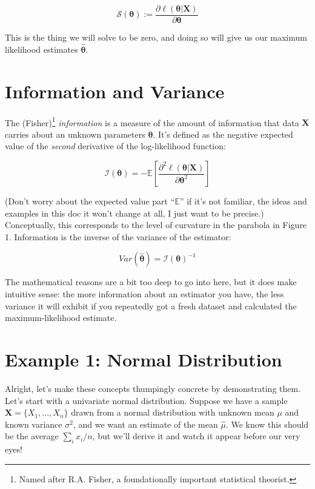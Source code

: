 \documentclass{article}
\begin{document}
\begin{equation}
\mathcal{S}(\boldsymbol{\theta}) := \frac{\partial \ell(\boldsymbol{\theta}|\mathbf{X})}{\partial \mathbf{\theta}}
\end{equation}

This is the thing we will solve to be zero, and doing so will give us our maximum likelihood estimates $\hat{\boldsymbol{\theta}}$.

\section{Information and Variance}

The (Fisher)\footnote{Named after R.A. Fisher, a foundationally important statistical theorist.} \textit{information} is a measure of the amount of information that data $\mathbf{X}$ carries about an unknown parameters
$\boldsymbol{\theta}$. It's defined as the negative expected value of the \textit{second} derivative of the log-likelihood function:

\begin{equation}
\mathcal{I}(\boldsymbol{\theta}) = -\mathbb{E}\left[\frac{\partial^2 \ell(\boldsymbol{\theta}|\mathbf{X})}{\partial \boldsymbol{\theta}^2}\right]
\end{equation}

(Don't worry about the expected value part ``$\mathbb{E}$'' if it's not familiar, the ideas and examples in this doc it won't change at all, I just want to be precise.) Conceptually, this corresponds to the level of curvature in the parabola in Figure 1. Information is the inverse of the variance of the estimator:

\begin{equation}
Var(\hat{\boldsymbol{\theta}}) = \mathcal{I}(\boldsymbol{\theta})^{-1}
\end{equation}

The mathematical reasons are a bit too deep to go into here, but it does make intuitive sense: the more information about an estimator you have, the less variance it will exhibit if you repeatedly got a fresh dataset and calculated the maximum-likelihood estimate.

\section{Example 1: Normal Distribution}

Alright, let's make these concepts thumpingly concrete by demonstrating them. Let's start with a univariate normal distribution. Suppose we have a sample $\mathbf{X}=\{X_1, ..., X_n\}$ drawn from a normal distribution with unknown mean $\mu$ and known variance $\sigma^2$, and we want an estimate of the mean $\hat{\mu}$. We know this should be the average $\sum_i x_i / n$, but we'll derive it and watch it appear before our very eyes! 
\end{document}

